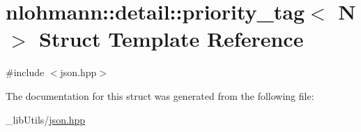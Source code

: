 \hypertarget{structnlohmann_1_1detail_1_1priority__tag}{}\section{nlohmann\+:\+:detail\+:\+:priority\+\_\+tag$<$ N $>$ Struct Template Reference}
\label{structnlohmann_1_1detail_1_1priority__tag}


{\ttfamily \#include $<$json.\+hpp$>$}



The documentation for this struct was generated from the following file\+:\begin{DoxyCompactItemize}
\item 
\+\_\+lib\+Utils/\hyperlink{json_8hpp}{json.\+hpp}\end{DoxyCompactItemize}
